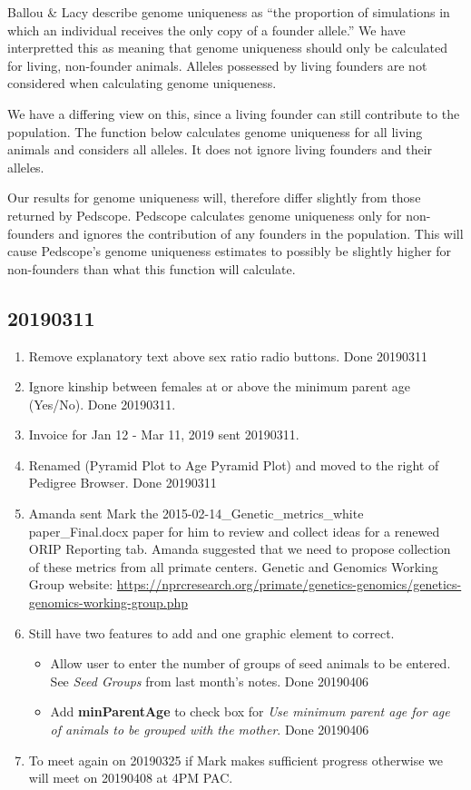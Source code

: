 \documentclass[
]{article}
\providecommand{\tightlist}{%
  \setlength{\itemsep}{0pt}\setlength{\parskip}{0pt}}
\begin{document}
Ballou \& Lacy describe genome uniqueness as ``the proportion of
simulations in which an individual receives the only copy of a founder
allele.'' We have interpretted this as meaning that genome uniqueness
should only be calculated for living, non-founder animals. Alleles
possessed by living founders are not considered when calculating genome
uniqueness.

We have a differing view on this, since a living founder can still
contribute to the population. The function below calculates genome
uniqueness for all living animals and considers all alleles. It does not
ignore living founders and their alleles.

Our results for genome uniqueness will, therefore differ slightly from
those returned by Pedscope. Pedscope calculates genome uniqueness only
for non-founders and ignores the contribution of any founders in the
population. This will cause Pedscope's genome uniqueness estimates to
possibly be slightly higher for non-founders than what this function
will calculate.

\hypertarget{section-14}{%
\subsection{20190311}\label{section-14}}

\begin{enumerate}
\def\labelenumi{\arabic{enumi}.}
\tightlist
\item
  Remove explanatory text above sex ratio radio buttons. Done 20190311
\item
  Ignore kinship between females at or above the minimum parent age
  (Yes/No). Done 20190311.
\item
  Invoice for Jan 12 - Mar 11, 2019 sent 20190311.
\item
  Renamed (Pyramid Plot to Age Pyramid Plot) and moved to the right of
  Pedigree Browser. Done 20190311
\item
  Amanda sent Mark the 2015-02-14\_Genetic\_metrics\_white
  paper\_Final.docx paper for him to review and collect ideas for a
  renewed ORIP Reporting tab. Amanda suggested that we need to propose
  collection of these metrics from all primate centers. Genetic and
  Genomics Working Group website:
  \url{https://nprcresearch.org/primate/genetics-genomics/genetics-genomics-working-group.php}
\item
  Still have two features to add and one graphic element to correct.

  \begin{itemize}
  \tightlist
  \item
    Allow user to enter the number of groups of seed animals to be
    entered. See \emph{Seed Groups} from last month's notes. Done
    20190406
  \item
    Add \textbf{minParentAge} to check box for \emph{Use minimum parent
    age for age of animals to be grouped with the mother}. Done 20190406
  \end{itemize}
\item
  To meet again on 20190325 if Mark makes sufficient progress otherwise
  we will meet on 20190408 at 4PM PAC.
\end{enumerate}
\end{document}
